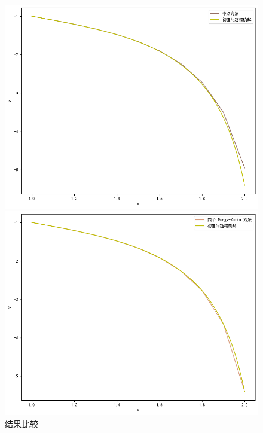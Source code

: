 \documentclass[UTF8,ctexart,a4paper,11pt,openany]{article}
\theoremstyle{definition}
\begin{document}
\begin{figure}[H]
            \\
            \begin{minipage}{0.42\textwidth}
                \centering
                \includegraphics[width=\linewidth]{pics/P9.4.png}
            \end{minipage}
            \hspace{2cm}
            \begin{minipage}{0.42\textwidth}
                \centering
                \includegraphics[width=\linewidth]{pics/P9.5.png}
            \end{minipage}
            \caption{结果比较}
        \end{figure}
\end{document}
